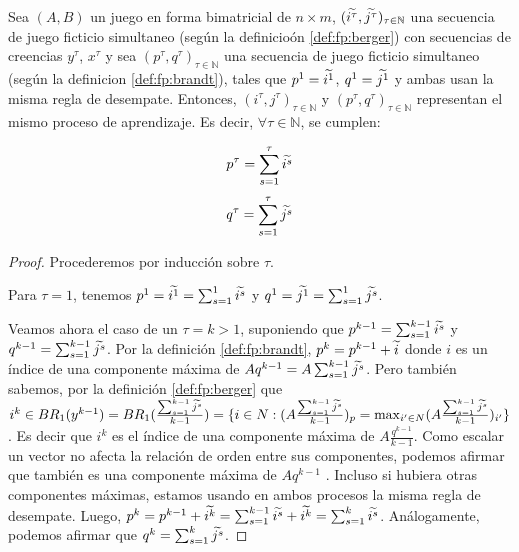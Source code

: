 \begin{lemma} \label{lema:equiv:sim}
    Sea $(A, B)$ un juego en forma bimatricial de $n \times m$, $(\widetilde{i^\tau}, \widetilde{j^\tau})_{\tau \in \mathbb{N}}$ una secuencia de juego ficticio simultaneo (según la definicioón \ref{def:fp:berger}) con secuencias de creencias $y^\tau$, $x^\tau$ y sea $(p^\tau, q^\tau)_{\tau \in \mathbb{N}}$ una secuencia de juego ficticio simultaneo (según la definicion \ref{def:fp:brandt}), tales que $p^1 = \widetilde{i^1}$, $q^1 = \widetilde{j^1}$ y ambas usan la misma regla de desempate. Entonces, $(i^\tau, j^\tau)_{\tau \in \mathbb{N}}$ y $(p^\tau, q^\tau)_{\tau \in \mathbb{N}}$ representan el mismo proceso de aprendizaje. Es decir, $\forall \tau \in \mathbb{N}$, se cumplen:

    \[ p^{\tau} = \sum_{s=1}^\tau{\widetilde{i^s}} \]
    \[ q^{\tau} = \sum_{s=1}^\tau{\widetilde{j^s}} \]

\end{lemma}
\begin{proof}
    Procederemos por inducción sobre $\tau$.

    Para $\tau = 1$, tenemos $p^1 = \widetilde{i^1} = \sum_{s=1}^1{\widetilde{i^s}}$ y $q^1 = \widetilde{j^1} = \sum_{s=1}^1{\widetilde{j^s}}$.

    Veamos ahora el caso de un $\tau = k > 1$, suponiendo que $p^{k-1} = \sum_{s=1}^{k-1}{\widetilde{i^s}}$ y $q^{k-1} = \sum_{s=1}^{k-1}{\widetilde{j^s}}$. Por la definición \ref{def:fp:brandt}, $p^k = p^{k-1} + \widetilde{i}$ donde $i$ es un índice de una componente máxima de $Aq^{k-1} = A\sum_{s=1}^{k-1}{\widetilde{j^s}}$. Pero también sabemos, por la definición \ref{def:fp:berger} que $i^k \in BR_1(y^{k-1}) = BR_1(\frac{\sum_{s=1}^{k-1} \widetilde{j^s}}{k-1}) = \{i \in N : (A\frac{\sum_{s=1}^{k-1} \widetilde{j^s}}{k-1})_p = \max_{i' \in N} (A\frac{\sum_{s=1}^{k-1} \widetilde{j^s}}{k-1})_{i'}\}$. Es decir que $i^k$ es el índice de una componente máxima de $A\frac{q^{k-1}}{k-1}$. Como escalar un vector no afecta la relación de orden entre sus componentes, podemos afirmar que también es una componente máxima de $Aq^{k-1}$ . Incluso si hubiera otras componentes máximas, estamos usando en ambos procesos la misma regla de desempate. Luego, $p^k = p^{k-1} + \widetilde{i^k} = \sum_{s=1}^{k-1}{\widetilde{i^s}} + \widetilde{i^k} = \sum_{s=1}^{k}{\widetilde{i^s}}$. Análogamente, podemos afirmar que $q^{k} = \sum_{s=1}^k{\widetilde{j^s}}$.
\end{proof}

